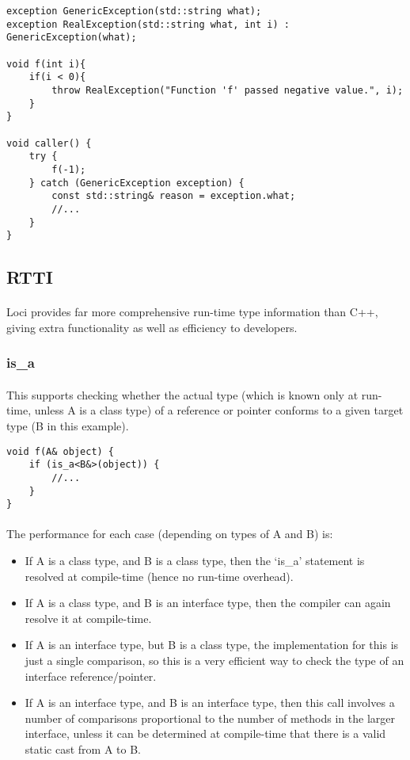 \documentclass[12pt,twoside,notitlepage]{report}
\begin{document}
\begin{lstlisting}
exception GenericException(std::string what);
exception RealException(std::string what, int i) : GenericException(what);

void f(int i){
	if(i < 0){
		throw RealException("Function 'f' passed negative value.", i);
	}
}

void caller() {
	try {
		f(-1);
	} catch (GenericException exception) {
		const std::string& reason = exception.what;
		//...
	}
}
\end{lstlisting}

\clearpage

\subsection{RTTI}

\paragraph{}
Loci provides far more comprehensive run-time type information than C++, giving extra functionality as well as efficiency to developers.

\subsubsection{is\_a}

\paragraph{}
This supports checking whether the actual type (which is known only at run-time, unless A is a class type) of a reference or pointer conforms to a given target type (B in this example).

\begin{lstlisting}
void f(A& object) {
	if (is_a<B&>(object)) {
		//...
	}
}
\end{lstlisting}

\paragraph{}
The performance for each case (depending on types of A and B) is:

\begin{itemize}
\item If A is a class type, and B is a class type, then the `is\_a' statement is resolved at compile-time (hence no run-time overhead).
\item If A is a class type, and B is an interface type, then the compiler can again resolve it at compile-time.
\item If A is an interface type, but B is a class type, the implementation for this is just a single comparison, so this is a very efficient way to check the type of an interface reference/pointer.
\item If A is an interface type, and B is an interface type, then this call involves a number of comparisons proportional to the number of methods in the larger interface, unless it can be determined at compile-time that there is a valid static cast from A to B.
\end{itemize}
\end{document}
